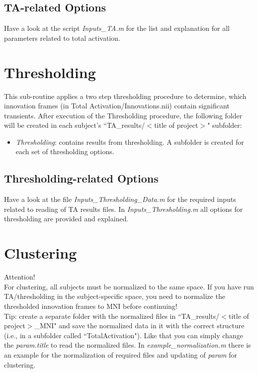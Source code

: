 \documentclass{article}
\begin{document}
\subsection{TA-related Options}
Have a look at the script \textit{Inputs\_TA.m} for the list and explanation for all parameters related to total activation.


\section{Thresholding}
This sub-routine applies a two step thresholding procedure to determine, which innovation frames (in Total Activation/Innovations.nii) contain significant transients. After execution of the Thresholding procedure, the following folder will be created in each subject's ``TA\_results/$<$title of project$>$" subfolder:
\begin{itemize}
\item \textit{Thresholding}: contains results from thresholding. A subfolder is created for each set of thresholding options.
\end{itemize}

\subsection{Thresholding-related Options}
Have a look at the file \textit{Inputs\_Thresholding\_Data.m} for the required inputs related to reading of TA results files. In \textit{Inputs\_Thresholding.m} all options for thresholding are provided and explained.


\section{Clustering}
\color{red}
Attention!\\
For clustering, all subjects must be normalized to the same space. If you have run TA/thresholding in the subject-specific space, you need to normalize the thresholded innovation frames to MNI before continuing!\\
Tip: create a separate folder with the normalized files in ``TA\_results/$<$title of project$>$\_MNI" and save the normalized data in it with the correct structure (i.e., in a subfolder called ``TotalActivation"). Like that you can simply change the \textit{param.title} to read the normalized files. In \textit{example\_normalization.m} there is an example for the normalization of required files and updating of \textit{param} for clustering.\\\\
\color{black}
%
\end{document}
